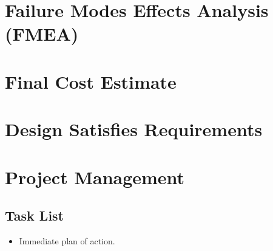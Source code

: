 \documentclass{article}
\newcommand{\cmark}{\ding{51}}%
\newcommand{\xmark}{\ding{55}}%
\newcommand{\done}{\rlap{$\square$}{\raisebox{2pt}{\large\hspace{1pt}\cmark}}%
\hspace{-2.5pt}}
\newcommand{\wontfix}{\rlap{$\square$}{\large\hspace{1pt}\xmark}}
\begin{document}
\newpage
\section{Failure Modes Effects Analysis (FMEA)}

\newpage
\section{Final Cost Estimate}

\newpage
\section{Design Satisfies Requirements}

\newpage
\section{Project Management}
\subsection{Task List}
\begin{itemize}
  \item Immediate plan of action.
\end{itemize}
\end{document}
